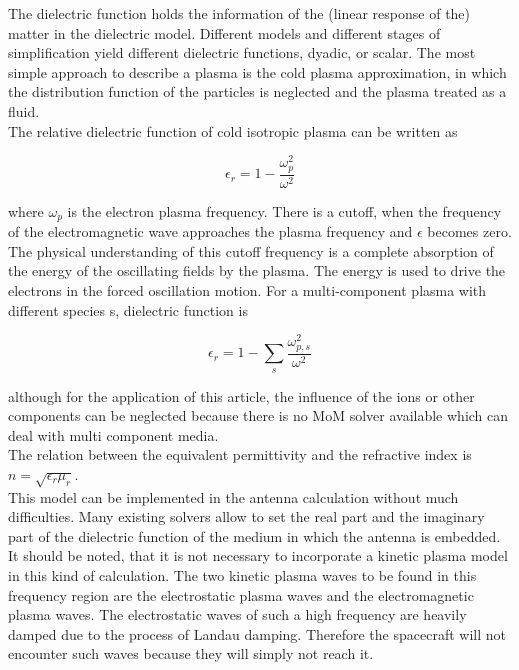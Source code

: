 \documentclass[two-coloumn,ras]{agutex}
\begin{document}
\begin{article}
The dielectric function holds the information of the (linear response of the) matter in the dielectric model. Different models and different stages of simplification yield different dielectric functions, dyadic, or scalar. The most simple approach to describe a plasma is the cold plasma approximation, in which the distribution function of the particles is neglected and the plasma treated as a fluid. \\

The relative dielectric function of cold isotropic plasma can be written as


\begin{equation}\label{epsilon_plasma}
   \epsilon_{r}=1-\frac{\omega_p^2 }{ \omega^2 }
\end{equation}

where $\omega_p$ is the electron plasma frequency. There is a cutoff, when the frequency of the electromagnetic wave approaches the plasma frequency and $\epsilon$ becomes zero. The physical understanding of this cutoff frequency is a complete absorption of the energy of the oscillating fields by the plasma. The energy is used to drive the electrons in the forced oscillation motion. For a multi-component plasma with different species s, dielectric function is

\begin{equation}
    \epsilon_{r}=1-\sum_s \frac{\omega_{p,s}^2 }{ \omega^2 } 
\end{equation}

although for the application of this article, the influence of the ions or other components can be neglected because there is no MoM solver available which can deal with multi component media.\\

The relation between the equivalent permittivity and the refractive index is $n=\sqrt{\epsilon_r\mu_r}$.\\ 

This model can be implemented in the antenna calculation without much difficulties. Many existing solvers allow to set the real part and the imaginary part of the dielectric function of the medium in which the antenna is embedded.\\

It should be noted, that it is not necessary to incorporate a kinetic plasma model in this kind of calculation. The two kinetic plasma waves to be found in this frequency region are the electrostatic plasma waves and the electromagnetic plasma waves. The electrostatic waves of such a high frequency are heavily damped due to the process of Landau damping. Therefore the spacecraft will not encounter such waves because they will simply not reach it.\\


\end{article}
\end{document}
